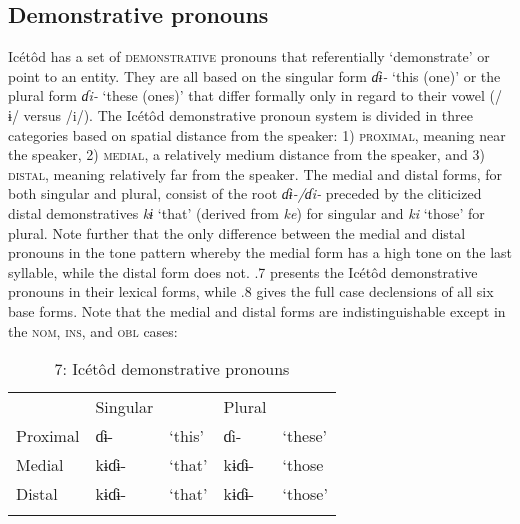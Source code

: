 \subsection{Demonstrative pronouns}


Icétôd has a set of \textsc{demonstrative} pronouns that referentially ‘demonstrate’ or point to an entity. They are all based on the singular form \textit{ɗɨ{}- }‘this (one)’ or the plural form \textit{ɗi- }‘these (ones)’ that differ formally only in regard to their vowel (/ɨ/ versus /i/). The Icétôd demonstrative pronoun system is divided in three categories based on spatial distance from the speaker: 1) \textsc{proximal}, meaning near the speaker, 2) \textsc{medial}, a relatively medium distance from the speaker, and 3) \textsc{distal}, meaning relatively far from the speaker. The medial and distal forms, for both singular and plural, consist of the root \textit{ɗɨ{}-/ɗi-} preceded by the cliticized distal demonstratives \textit{kɨ }‘that’ (derived from \textit{ke}) for singular and \textit{ki }‘those’ for plural. Note further that the only difference between the medial and distal pronouns in the tone pattern whereby the medial form has a high tone on the last syllable, while the distal form does not. .7 presents the Icétôd demonstrative pronouns in their lexical forms, while .8 gives the full case declensions of all six base forms. Note that the medial and distal forms are indistinguishable except in the \textsc{nom}, \textsc{ins}, and \textsc{obl} cases:


\begin{table}
\caption{7: Icétôd demonstrative pronouns}
\label{tab:5}


\begin{tabularx}{\textwidth}{XXXXX} & Singular &  & Plural & \\
\lsptoprule
Proximal & ɗɨ{}- & ‘this’ & ɗi- & ‘these’\\
Medial & kɨɗɨ- & ‘that’ & kɨɗɨ- & ‘those\\
Distal & kɨɗɨ- & ‘that’ & kɨɗɨ- & ‘those’\\
\lspbottomrule
\end{tabularx}
\end{table}


